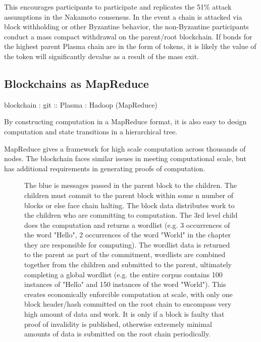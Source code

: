 \documentclass[letterpaper, 11pt]{article}
\begin{document}
This encourages participants to participate and replicates the 51\% attack
assumptions in the Nakamoto consensus. In the event a chain is attacked via
block withholding or other Byzantine behavior, the non-Byzantine participants
conduct a mass compact withdrawal on the parent/root blockchain. If bonds for
the highest parent Plasma chain are in the form of tokens, it is likely the
value of the token will significantly devalue as a result of the mass exit.

\subsection{Blockchains as MapReduce}

\begin{center}
	blockchain : git :: Plasma : Hadoop (MapReduce)
\end{center}

By constructing computation in a MapReduce format, it is also easy to design
computation and state transitions in a hierarchical tree.

MapReduce gives a framework for high scale computation across thousands of
nodes. The blockchain faces similar issues in meeting computational scale, but
has additional requirements in generating proofs of computation.

\begin{figure}[H]
	\caption{
		The blue is messages passed in the parent block to the children.
		The children must commit to the parent block within some n
		number of blocks or else face chain halting. The block data
		distributes work to the children who are committing to
		computation. The 3rd level child does the computation and
		returns a wordlist (e.g. 3 occurrences of the word "Hello", 2
		occurrences of the word "World" in the chapter they are
		responsible for computing). The wordlist data is returned to the
		parent as part of the commitment, wordlists are combined
		together from the children and submitted to the parent,
		ultimately completing a global wordlist (e.g. the entire corpus
		contains 100 instances of "Hello" and 150 instances of the word
		"World"). This creates economically enforcible computation at
		scale, with only one block header/hash committed on the root
		chain to encompass very high amount of data and work. It is only
		if a block is faulty that proof of invalidity is published,
		otherwise extremely minimal amounts of data is submitted on the
		root chain periodically.
		}
\end{figure}
\end{document}
